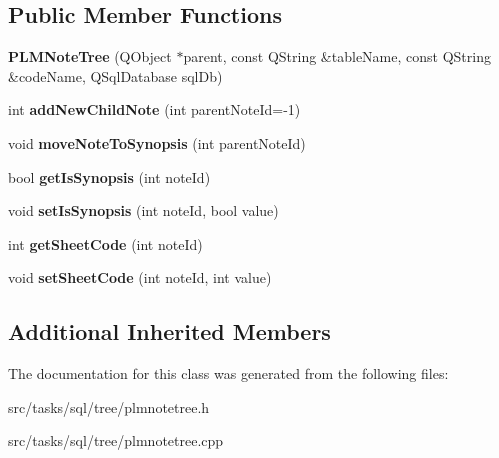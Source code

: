 \subsection*{Public Member Functions}
\begin{DoxyCompactItemize}
\item 
{\bfseries P\+L\+M\+Note\+Tree} (Q\+Object $\ast$parent, const Q\+String \&table\+Name, const Q\+String \&code\+Name, Q\+Sql\+Database sql\+Db)\hypertarget{class_p_l_m_note_tree_aa395393799f5b8fbb0cf6aa531ad7b13}{}\label{class_p_l_m_note_tree_aa395393799f5b8fbb0cf6aa531ad7b13}

\item 
int {\bfseries add\+New\+Child\+Note} (int parent\+Note\+Id=-\/1)\hypertarget{class_p_l_m_note_tree_ab6ac0c7604d9017cc2c20cf94da35b90}{}\label{class_p_l_m_note_tree_ab6ac0c7604d9017cc2c20cf94da35b90}

\item 
void {\bfseries move\+Note\+To\+Synopsis} (int parent\+Note\+Id)\hypertarget{class_p_l_m_note_tree_a448f0356af7b2cb17e038959423aa800}{}\label{class_p_l_m_note_tree_a448f0356af7b2cb17e038959423aa800}

\item 
bool {\bfseries get\+Is\+Synopsis} (int note\+Id)\hypertarget{class_p_l_m_note_tree_ab4a572fb6142f7a1ffdaf3885883351a}{}\label{class_p_l_m_note_tree_ab4a572fb6142f7a1ffdaf3885883351a}

\item 
void {\bfseries set\+Is\+Synopsis} (int note\+Id, bool value)\hypertarget{class_p_l_m_note_tree_a0cb70c674930a4b0bebb4532a0737aa0}{}\label{class_p_l_m_note_tree_a0cb70c674930a4b0bebb4532a0737aa0}

\item 
int {\bfseries get\+Sheet\+Code} (int note\+Id)\hypertarget{class_p_l_m_note_tree_a8355d84fa27bdaa0355c8be065372178}{}\label{class_p_l_m_note_tree_a8355d84fa27bdaa0355c8be065372178}

\item 
void {\bfseries set\+Sheet\+Code} (int note\+Id, int value)\hypertarget{class_p_l_m_note_tree_a90b6d91a8696286c42f77c83b3601de9}{}\label{class_p_l_m_note_tree_a90b6d91a8696286c42f77c83b3601de9}

\end{DoxyCompactItemize}
\subsection*{Additional Inherited Members}


The documentation for this class was generated from the following files\+:\begin{DoxyCompactItemize}
\item 
src/tasks/sql/tree/plmnotetree.\+h\item 
src/tasks/sql/tree/plmnotetree.\+cpp\end{DoxyCompactItemize}
